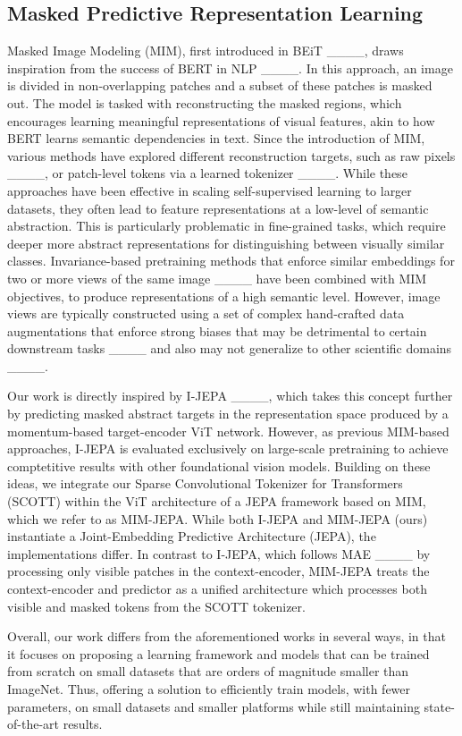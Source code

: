 \subsection{Masked Predictive Representation Learning}
Masked Image Modeling (MIM), first introduced in BEiT ____, draws inspiration from the success of BERT in NLP ____. In this approach, an image is divided in non-overlapping patches and a subset of these patches is masked out. The model is tasked with reconstructing the masked regions, which encourages learning meaningful representations of visual features, akin to how BERT learns semantic dependencies in text. Since the introduction of MIM, various methods have explored different reconstruction targets, such as raw  pixels ____,  or patch-level tokens via a learned tokenizer ____. While these approaches have been effective in scaling self-supervised learning to larger datasets, they often lead to feature representations at a low-level of semantic abstraction. This is particularly problematic in fine-grained tasks, which require deeper more abstract representations for distinguishing between visually similar classes. Invariance-based pretraining methods that enforce similar embeddings for two or more views of the same image ____ have been combined with MIM objectives, to produce representations of a high semantic level. However, image views are typically constructed using a set of complex hand-crafted data augmentations that enforce strong biases that may be detrimental to certain downstream tasks ____ and also may not generalize to other scientific domains ____. 

Our work is directly inspired by I-JEPA ____, which takes this concept further by predicting masked abstract targets in the representation space produced by a momentum-based target-encoder ViT network. However, as previous MIM-based approaches, I-JEPA is evaluated exclusively on large-scale pretraining to achieve comptetitive results with other foundational vision models. Building on these ideas, we integrate our Sparse Convolutional Tokenizer for Transformers (SCOTT) within the ViT architecture of a JEPA framework based on MIM, which we refer to as MIM-JEPA. While both I-JEPA and MIM-JEPA (ours) instantiate a Joint-Embedding Predictive Architecture (JEPA), the implementations differ. In contrast to I-JEPA, which follows MAE ____ by processing only visible patches in the context-encoder, MIM-JEPA treats the context-encoder and predictor as a unified architecture which processes both visible and masked tokens from the SCOTT tokenizer. 

Overall, our work differs from the aforementioned works in several ways, in that it focuses on proposing a learning framework and models that can be trained from scratch on small datasets that are orders of magnitude smaller than ImageNet. Thus, offering a solution to efficiently train models, with fewer parameters, on small datasets and smaller platforms while still maintaining state-of-the-art results.